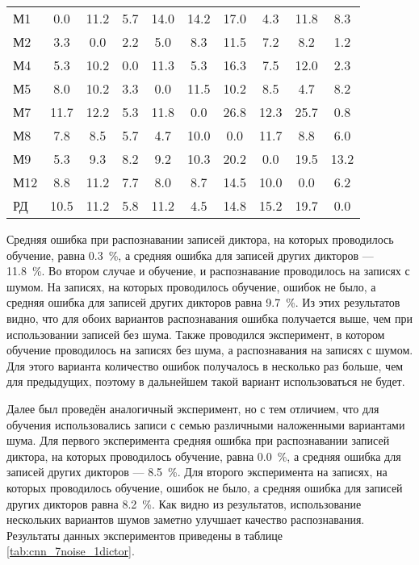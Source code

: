 \begin{table}[h]
\begin{tabular}{| l | c | c | c | c | c | c | c | c | c |}
		\hline
		М1		 &  0.0 & 11.2 &  5.7 & 14.0 & 14.2 & 17.0 &  4.3 & 11.8 &  8.3 \\
		М2		 &  3.3 &  0.0 &  2.2 &  5.0 &  8.3 & 11.5 &  7.2 &  8.2 &  1.2 \\
		М4		 &  5.3 & 10.2 &  0.0 & 11.3 &  5.3 & 16.3 &  7.5 & 12.0 &  2.3 \\
		М5		 &  8.0 & 10.2 &  3.3 &  0.0 & 11.5 & 10.2 &  8.5 &  4.7 &  8.2 \\
		М7		 & 11.7 & 12.2 &  5.3 & 11.8 &  0.0 & 26.8 & 12.3 & 25.7 &  0.8 \\
		М8		 &  7.8 &  8.5 &  5.7 &  4.7 & 10.0 &  0.0 & 11.7 &  8.8 &  6.0 \\
		М9		 &  5.3 &  9.3 &  8.2 &  9.2 & 10.3 & 20.2 &  0.0 & 19.5 & 13.2 \\
		М12		 &  8.8 & 11.2 &  7.7 &  8.0 &  8.7 & 14.5 & 10.0 &  0.0 &  6.2 \\
		РД		 & 10.5 & 11.2 &  5.8 & 11.2 &  4.5 & 14.8 & 15.2 & 19.7 &  0.0 \\
		\hline
	\end{tabular}
\end{table}

Средняя ошибка при распознавании записей диктора, на которых проводилось обучение, равна 0.3~\%, а средняя ошибка для записей других дикторов --- 11.8~\%.
Во втором случае и обучение, и распознавание проводилось на записях с шумом.
На записях, на которых проводилось обучение, ошибок не было, а средняя ошибка для записей других дикторов равна 9.7~\%.
Из этих результатов видно, что для обоих вариантов распознавания ошибка получается выше, чем при использовании записей без шума.
Также проводился эксперимент, в котором обучение проводилось на записях без шума, а распознавания на записях с шумом.
Для этого варианта количество ошибок получалось в несколько раз больше, чем для предыдущих, поэтому в дальнейшем такой вариант использоваться не будет.

Далее был проведён аналогичный эксперимент, но с тем отличием, что для обучения использовались записи с семью различными наложенными вариантами шума.
Для первого эксперимента средняя ошибка при распознавании записей диктора, на которых проводилось обучение, равна 0.0~\%, а средняя ошибка для записей других дикторов --- 8.5~\%.
Для второго эксперимента на записях, на которых проводилось обучение, ошибок не было, а средняя ошибка для записей других дикторов равна 8.2~\%.
Как видно из результатов, использование нескольких вариантов шумов заметно улучшает качество распознавания.
Результаты данных экспериментов приведены в таблице \ref{tab:cnn_7noise_1dictor}.

